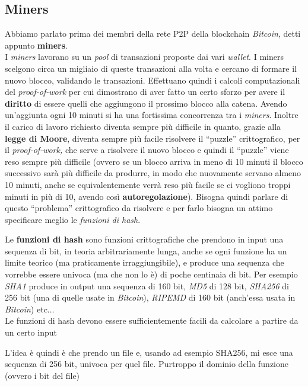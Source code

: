 \documentclass[a4paper,12pt, oneside]{book}
\begin{document}
\subsection{Miners}
Abbiamo parlato prima dei membri della rete P2P della blockchain
\textit{Bitcoin}, detti appunto \textbf{miners}.\\
I \textit{miners} lavorano su un \textit{pool} di transazioni proposte dai vari
\textit{wallet}. I miners scelgono circa un migliaio di queste transazioni alla
volta e cercano di formare il nuovo blocco, validando le transazioni. Effettuano
quindi i calcoli computazionali del \textit{proof-of-work} per cui dimostrano di
aver fatto un certo sforzo per avere il \textbf{diritto} di essere quelli che
aggiungono il prossimo blocco alla catena. Avendo un'aggiunta ogni 10 minuti si
ha una fortissima concorrenza tra i \textit{miners}. Inoltre il carico di lavoro
richiesto diventa sempre più difficile in quanto, grazie alla \textbf{legge
  di Moore}, diventa sempre più facile risolvere il ``puzzle'' crittografico,
per il \textit{proof-of-work,} che
serve a risolvere il nuovo blocco e quindi il ``puzzle'' viene reso sempre più
difficile (ovvero se un blocco arriva in meno di 10 minuti il blocco successivo
sarà più difficile da produrre, in modo che nuovamente servano almeno 10 minuti,
anche se equivalentemente verrà reso più facile se ci vogliono troppi minuti in
più di 10, avendo così \textbf{autoregolazione}). Bisogna quindi parlare di
questo ``problema'' crittografico da risolvere e per farlo bisogna un attimo
specificare meglio le \textit{funzioni di hash}.
\begin{definizione}
  Le \textbf{funzioni di hash} sono funzioni crittografiche che prendono in
  input una sequenza di bit, in teoria arbitrariamente lunga, anche se ogni
  funzione ha un limite teorico (ma praticamente irraggiungibile), e produce una
  sequenza che vorrebbe essere univoca (ma che non lo è) di poche centinaia di
  bit. Per esempio \textit{SHA1} produce in output una sequenza di 160 bit,
  \textit{MD5} di 128 bit, \textit{SHA256} di 256 bit (una di
  quelle usate in \textit{Bitcoin}), \textit{RIPEMD} di 160 bit (anch'essa usata
  in \textit{Bitcoin}) etc$\ldots$\\
  Le funzioni di hash devono essere sufficientemente facili da calcolare a
  partire da un certo input
\end{definizione}
L'idea è quindi è che prendo un file e, usando ad esempio SHA256, mi esce una
sequenza di 256 bit, univoca per quel file. Purtroppo il dominio della funzione
(ovvero i bit del file)
\end{document}
